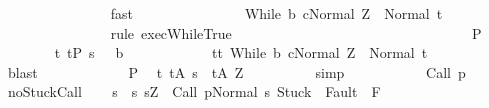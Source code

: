 \begin{isabellebody}
\ \ \ \ \ \ \ \ \ \ \ \ \ \ \isamarkupfalse%
\ fast\isanewline
\ \ \ \ \ \ \ \ \ \ \ \ \isamarkupfalse%
\ \isamarkupfalse%
\ {\isachardoublequoteopen}{\isasymGamma}{\isasymturnstile}{\isasymlangle}While\ b\ c{\isacharcomma}Normal\ Z{\isasymrangle}\ {\isasymRightarrow}\ Normal\ t{\isachardoublequoteclose}\isanewline
\ \ \ \ \ \ \ \ \ \ \ \ \ \ \isamarkupfalse%
\ {\isacharparenleft}rule\ exec{\isachardot}WhileTrue{\isacharparenright}\isanewline
\ \ \ \ \ \ \ \ \ \ \isamarkupfalse%
\isanewline
\ \ \ \ \ \ \ \ \isamarkupfalse%
\isanewline
\ \ \ \ \ \ \isacommand{{\isacharbraceright}}\isamarkupfalse%
\isanewline
\ \ \ \ \ \ \isamarkupfalse%
\ P\isanewline
\ \ \ \ \ \ \isamarkupfalse%
\ {\isachardoublequoteopen}{\isacharparenleft}{\isasymforall}t{\isachardot}\ t{\isasymin}{\isacharparenleft}{\isacharquery}P{\isacharprime}\ s\ {\isasyminter}\ {\isacharminus}\ b{\isacharparenright}\isanewline
\ \ \ \ \ \ \ \ \ \ \ \ {\isasymlongrightarrow}t{\isasymin}{\isacharbraceleft}t{\isachardot}\ {\isasymGamma}{\isasymturnstile}{\isasymlangle}While\ b\ c{\isacharcomma}Normal\ Z{\isasymrangle}\ {\isasymRightarrow}\ Normal\ t{\isacharbraceright}{\isacharparenright}{\isachardoublequoteclose}\isanewline
\ \ \ \ \ \ \ \ \isamarkupfalse%
\ blast\isanewline
\ \ \ \ \isamarkupfalse%
\isanewline
\ \ \ \ \ \ \isamarkupfalse%
\ P\ \isamarkupfalse%
\ {\isachardoublequoteopen}{\isasymforall}t{\isachardot}\ t{\isasymin}{\isacharquery}A\ s\ {\isasymlongrightarrow}\ t{\isasymin}{\isacharquery}A\ Z{\isachardoublequoteclose}\isanewline
\ \ \ \ \ \ \ \ \isamarkupfalse%
\ simp\isanewline
\ \ \ \ \isamarkupfalse%
\isanewline
\ \ \isamarkupfalse%
\isanewline
{}\isamarkupfalse%
\isanewline
\ \ \isamarkupfalse%
\ {\isacharparenleft}Call\ p{\isacharparenright}\isanewline
\ \ \isamarkupfalse%
\ noStuck{\isacharunderscore}Call\isanewline
\ \ \isamarkupfalse%
\ {\isachardoublequoteopen}{\isasymforall}s\ {\isasymin}\ {\isacharbraceleft}s{\isachardot}\ s{\isacharequal}Z\ {\isasymand}\ {\isasymGamma}{\isasymturnstile}{\isasymlangle}Call\ p{\isacharcomma}Normal\ s{\isasymrangle}\ {\isasymRightarrow}{\isasymnotin}{\isacharparenleft}{\isacharbraceleft}Stuck{\isacharbraceright}\ {\isasymunion}\ Fault\ {\isacharbackquote}\ {\isacharparenleft}{\isacharminus}F{\isacharparenright}{\isacharparenright}\ {\isasymand}\isanewline

\end{isabellebody}
